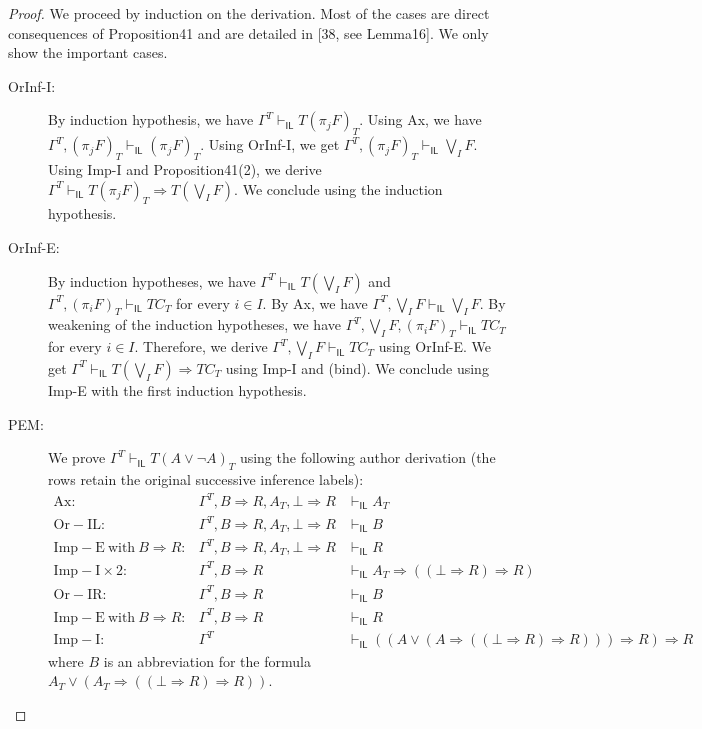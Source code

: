 \documentclass[10pt,a4paper]{article}
\newcommand{\IL}{\mathsf{IL}}
\begin{document}
\begin{proof}
We proceed by induction on the derivation. Most of the cases are direct consequences of Proposition41 and are detailed in [38, see Lemma16]. We only show the important cases.
\begin{description}
\item[OrInf-I:] By induction hypothesis, we have $\Gamma^T\vdash_\IL T(\pi_jF)_T$. Using Ax, we have $\Gamma^T,(\pi_jF)_T\vdash_\IL(\pi_jF)_T$. Using OrInf-I, we get $\Gamma^T,(\pi_jF)_T\vdash_\IL\bigvee_I F$. Using Imp-I and Proposition41(2), we derive $\Gamma^T\vdash_\IL T(\pi_jF)_T\Rightarrow T(\bigvee_I F)$. We conclude using the induction hypothesis.
\item[OrInf-E:] By induction hypotheses, we have $\Gamma^T\vdash_\IL T(\bigvee_I F)$ and $\Gamma^T,(\pi_iF)_T\vdash_\IL TC_T$ for every $i\in I$. By Ax, we have $\Gamma^T,\bigvee_I F\vdash_\IL\bigvee_I F$. By weakening of the induction hypotheses, we have $\Gamma^T,\bigvee_I F,(\pi_iF)_T\vdash_\IL TC_T$ for every $i\in I$. Therefore, we derive $\Gamma^T,\bigvee_I F\vdash_\IL TC_T$ using OrInf-E. We get $\Gamma^T\vdash_\IL T(\bigvee_I F)\Rightarrow TC_T$ using Imp-I and (bind). We conclude using Imp-E with the first induction hypothesis.
\item[PEM:] We prove $\Gamma^T\vdash_\IL T(A\vee\neg A)_T$ using the following author derivation (the rows retain the original successive inference labels):
\[\begin{array}{rcl}\mathrm{Ax}:&\Gamma^T,B\Rightarrow R,A_T,\bot\Rightarrow R&\vdash_\IL A_T\\\mathrm{Or\!\!-IL}:&\Gamma^T,B\Rightarrow R,A_T,\bot\Rightarrow R&\vdash_\IL B\\\mathrm{Imp\!\!-E\ with}\ B\Rightarrow R:&\Gamma^T,B\Rightarrow R,A_T,\bot\Rightarrow R&\vdash_\IL R\\\mathrm{Imp\!\!-I}\times2:&\Gamma^T,B\Rightarrow R&\vdash_\IL A_T\Rightarrow((\bot\Rightarrow R)\Rightarrow R)\\\mathrm{Or\!\!-IR}:&\Gamma^T,B\Rightarrow R&\vdash_\IL B\\\mathrm{Imp\!\!-E\ with}\ B\Rightarrow R:&\Gamma^T,B\Rightarrow R&\vdash_\IL R\\\mathrm{Imp\!\!-I}:&\Gamma^T&\vdash_\IL((A\vee(A\Rightarrow((\bot\Rightarrow R)\Rightarrow R)))\Rightarrow R)\Rightarrow R\end{array}\]
where $B$ is an abbreviation for the formula $A_T\vee(A_T\Rightarrow((\bot\Rightarrow R)\Rightarrow R))$.
\end{description}
\end{proof}
\end{document}
